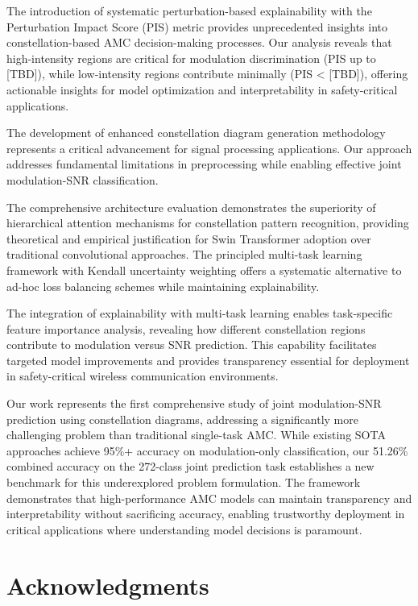 \documentclass{ELSP}
\begin{document}
{{The introduction of systematic perturbation-based explainability with the Perturbation Impact Score (PIS) metric provides unprecedented insights into constellation-based AMC decision-making processes. Our analysis reveals that high-intensity regions are critical for modulation discrimination (PIS up to [TBD]), while low-intensity regions contribute minimally (PIS < [TBD]), offering actionable insights for model optimization and interpretability in safety-critical applications.

The development of enhanced constellation diagram generation methodology represents a critical advancement for signal processing applications. Our approach addresses fundamental limitations in preprocessing while enabling effective joint modulation-SNR classification.

The comprehensive architecture evaluation demonstrates the superiority of hierarchical attention mechanisms for constellation pattern recognition, providing theoretical and empirical justification for Swin Transformer adoption over traditional convolutional approaches. The principled multi-task learning framework with Kendall uncertainty weighting offers a systematic alternative to ad-hoc loss balancing schemes while maintaining explainability.

The integration of explainability with multi-task learning enables task-specific feature importance analysis, revealing how different constellation regions contribute to modulation versus SNR prediction. This capability facilitates targeted model improvements and provides transparency essential for deployment in safety-critical wireless communication environments.

Our work represents the first comprehensive study of joint modulation-SNR prediction using constellation diagrams, addressing a significantly more challenging problem than traditional single-task AMC. While existing SOTA approaches achieve 95\%+ accuracy on modulation-only classification, our 51.26\% combined accuracy on the 272-class joint prediction task establishes a new benchmark for this underexplored problem formulation. The framework demonstrates that high-performance AMC models can maintain transparency and interpretability without sacrificing accuracy, enabling trustworthy deployment in critical applications where understanding model decisions is paramount.

\section*{Acknowledgments}
 
}}
\end{document}
